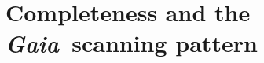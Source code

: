 \documentclass[modern]{aastex62}
\newcommand{\gaia}{\textsl{Gaia}}
\begin{document}



\clearpage

\appendix
\section{Completeness and the \gaia\ scanning pattern}
\label{sec:completeness}

\end{document}
